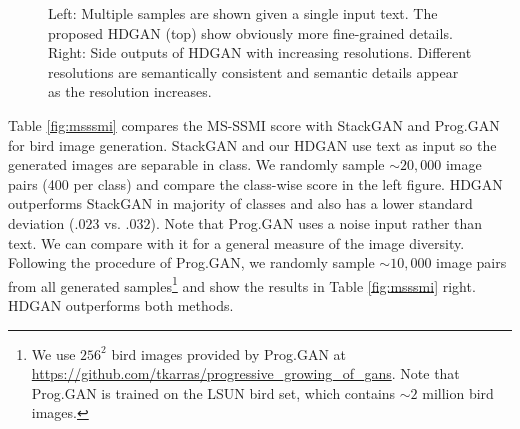 \documentclass[10pt,twocolumn,letterpaper]{article}
\begin{document}
\begin{figure}[t]
\begin{subfigure}[t]{0.3\textwidth}
    \end{subfigure}
    \vspace{-.2cm}
    \caption{Left: Multiple samples are shown given a single input text. The proposed HDGAN (top) show obviously more fine-grained details. Right: Side outputs of HDGAN with increasing resolutions. Different resolutions are semantically consistent and semantic details appear as the resolution increases.  \label{fig:multiple-test}}     \vspace{-.3cm}
\end{figure}




Table \ref{fig:msssmi} compares the MS-SSMI score with StackGAN and Prog.GAN for bird image generation. StackGAN and our HDGAN use text as input so the generated images are separable in class. We randomly sample ${\sim}20,000$ image pairs (400 per class) and compare the class-wise score in the left figure. HDGAN outperforms StackGAN in majority of classes and also has a lower standard deviation ($.023$ vs. $.032$).
Note that Prog.GAN uses a noise input rather than text. We can compare with it for a general measure of the image diversity. Following the procedure of Prog.GAN, we randomly sample ${\sim}10,000$ image pairs from all generated samples\footnote{We use $256^2$ bird images provided by Prog.GAN at \url{https://github.com/tkarras/progressive_growing_of_gans}. Note that Prog.GAN is trained on the LSUN \cite{yu2015lsun} bird set, which contains ${\sim}2$ million bird images.} and show the results in Table \ref{fig:msssmi} right. HDGAN outperforms both methods.
 
\end{document}
